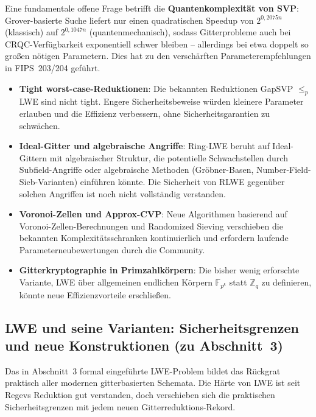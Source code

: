 ﻿\documentclass[a4paper,12pt]{article}
\theoremstyle{definition}
\begin{document}
Eine fundamentale offene Frage betrifft die \textbf{Quantenkomplexität
von SVP}: Grover-basierte Suche liefert nur einen quadratischen Speedup
von $2^{0{,}2075 n}$ (klassisch) auf $2^{0{,}1047n}$ (quantenmechanisch),
sodass Gitterprobleme auch bei CRQC-Verfügbarkeit exponentiell schwer
bleiben -- allerdings bei etwa doppelt so großen nötigen Parametern.
Dies hat zu den verschärften Parameterempfehlungen in FIPS~203/204
geführt.

\begin{itemize}
  \item \textbf{Tight worst-case-Reduktionen}: Die bekannten Reduktionen
    GapSVP $\leq_p$ LWE sind nicht tight. Engere Sicherheitsbeweise
    würden kleinere Parameter erlauben und die Effizienz verbessern,
    ohne Sicherheitsgarantien zu schwächen.
  \item \textbf{Ideal-Gitter und algebraische Angriffe}: Ring-LWE beruht
    auf Ideal-Gittern mit algebraischer Struktur, die potentielle
    Schwachstellen durch Subfield-Angriffe oder algebraische Methoden
    (Gröbner-Basen, Number-Field-Sieb-Varianten) einführen könnte.
    Die Sicherheit von RLWE gegenüber solchen Angriffen ist noch nicht
    vollständig verstanden.
  \item \textbf{Voronoi-Zellen und Approx-CVP}: Neue Algorithmen
    basierend auf Voronoi-Zellen-Berechnungen und Randomized Sieving
    verschieben die bekannten Komplexitätsschranken kontinuierlich
    und erfordern laufende Parameterneubewertungen durch die Community.
  \item \textbf{Gitterkryptographie in Primzahlkörpern}: Die bisher
    wenig erforschte Variante, LWE über allgemeinen endlichen Körpern
    $\mathbb{F}_{p^k}$ statt $\mathbb{Z}_q$ zu definieren, könnte
    neue Effizienzvorteile erschließen.
\end{itemize}

\subsection{LWE und seine Varianten: Sicherheitsgrenzen und neue Konstruktionen (zu Abschnitt~3)}

Das in Abschnitt~3 formal eingeführte LWE-Problem bildet das Rückgrat
praktisch aller modernen gitterbasierten Schemata. Die Härte von LWE
ist seit Regevs Reduktion \cite{Reg05} gut verstanden, doch verschieben
sich die praktischen Sicherheitsgrenzen mit jedem neuen
Gitterreduktions-Rekord.
\end{document}
